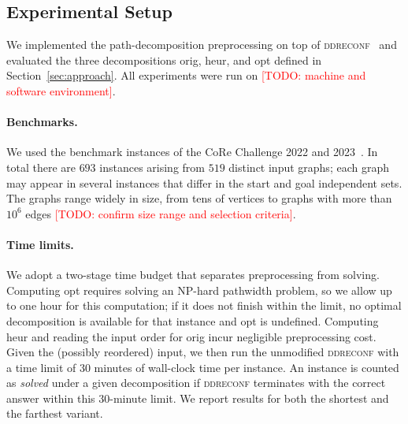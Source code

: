 \documentclass[conference]{IEEEtran}
\newcommand{\todo}[1]{\textcolor{red}{[TODO: #1]}}
\newcommand{\OrigDecom}{\textsf{orig}\xspace}
\newcommand{\HeurDecom}{\textsf{heur}\xspace}
\newcommand{\OptDecom}{\textsf{opt}\xspace}
\begin{document}
\subsection{Experimental Setup}
\label{subsec:setup}

We implemented the path-decomposition preprocessing on top of
\textsc{ddreconf}~\cite{ItoKNSSTT23} and evaluated the three decompositions
\OrigDecom, \HeurDecom, and \OptDecom defined in Section~\ref{sec:approach}.
All experiments were run on \todo{machine and software environment}.

\paragraph{Benchmarks.}
We used the benchmark instances of the CoRe Challenge 2022 and
2023~\cite{sotaokit24}. In total there are $693$ instances arising from $519$
distinct input graphs; each graph may appear in several instances that differ in
the start and goal independent sets.
The graphs range widely in size, from tens of vertices to graphs with more than
$10^{6}$ edges \todo{confirm size range and selection criteria}.

\paragraph{Time limits.}
We adopt a two-stage time budget that separates preprocessing from solving.
Computing \OptDecom requires solving an NP-hard pathwidth problem, so we allow up
to one hour for this computation; if it does not finish within the limit, no
optimal decomposition is available for that instance and \OptDecom is undefined.
Computing \HeurDecom and reading the input order for \OrigDecom incur negligible
preprocessing cost.
Given the (possibly reordered) input, we then run the unmodified
\textsc{ddreconf} with a time limit of $30$ minutes of wall-clock time per
instance. An instance is counted as \emph{solved} under a given decomposition if
\textsc{ddreconf} terminates with the correct answer within this $30$-minute
limit.
We report results for both the shortest and the farthest variant.
\end{document}
